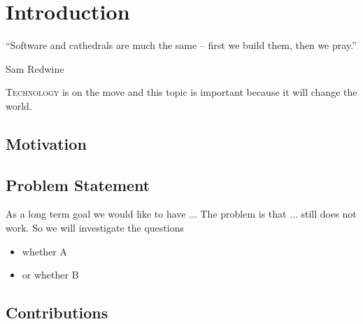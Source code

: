 \documentclass[%
    ]{\PathToTumTemplate/thesis/tum_thesis}
\begin{document}



\cleardoublepage
\mainmatter


\chapter{Introduction}
\epigraph{“Software and cathedrals are much the same – first we build them, then we pray.”}{Sam Redwine}




 
\lettrine{T}{echnology} is on the move and this topic is important because it will change the world.





\section{Motivation}\label{sec:motivation}



\section{Problem Statement}\label{sec:probstat}
As a long term goal we would like to have ...
The problem is that ... still does not work. So we will investigate the questions
\begin{itemize}
    \item whether A
    \item or whether B
\end{itemize}



\section{Contributions}\label{sec:contributions}
\end{document}
